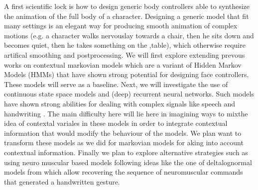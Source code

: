 

A first scientific lock is how to design generic body controllers able to synthesize the animation of the full body of a character. 
Designing a generic model that fit many settings is an elegant way for producing smooth animation of complex motions (e.g. a character walks nervouslay towards a chair, then he sits down and becomes quiet, then he takes something on the ,table), which otherwise require artifical smoothing and postprocessing. We will first explore extending prevous works on contextual markovian models \cite{Radenen2014, Ding2013, Ding2014} which are a variant of Hidden Markov Models (HMMs) that have shown strong potential for designing face controllers. These models will serve as a baseline. 
Next, we will investigate the use of continuous state space models and (deep) recurrent neural networks. Such models have shown strong abilities for dealing with complex signals like speech and handwriting \cite{Graves, Schmidhuber}. 
The main difficulty here will lie here in imagining ways to mixthe idea of contextal variales in these models in order to integrate contextual information that would modify the behaviour of the models. 
We plan want to transform these models as we did for markovian models for aking into account contextual information. 
Finally we plan to explore alternative strategies such as using neuro muscular based models following ideas like the one of deltalognormal models from \cite{O'Reilly, 2012} which allow recovering the sequence of neuromuscular commands that generated a handwritten gesture. 


